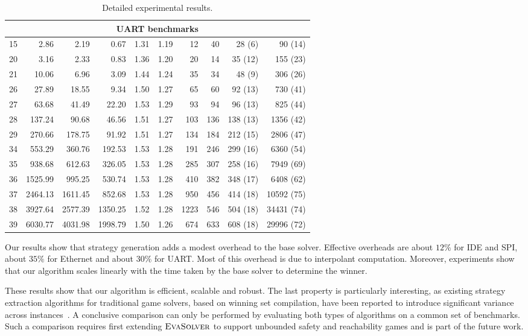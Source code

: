\begin{table}[t]
{\begin{tabular}{r r r r r r r r r r}
\hline
\multicolumn{10}{c}{UART benchmarks} \\
\hline
15 & 2.86 & 2.19 & 0.67 & 1.31 & 1.19 & 12             & 40  & 28 (6)   & 90 (14)    \\
20 & 3.16 & 2.33 & 0.83 & 1.36 & 1.20 & 20             & 14  & 35 (12)  & 155 (23)   \\
21 & 10.06 & 6.96 & 3.09 & 1.44 & 1.24 & 35            & 34  & 48 (9)   & 306 (26)   \\
26 & 27.89 & 18.55 & 9.34 & 1.50 & 1.27 & 65           & 60  & 92 (13)  & 730 (41)   \\
27 & 63.68 & 41.49 & 22.20 & 1.53 & 1.29 & 93          & 94  & 96 (13)  & 825 (44)   \\
28 & 137.24 & 90.68 & 46.56 & 1.51 & 1.27 & 103        & 136 & 138 (13) & 1356 (42)   \\
29 & 270.66 & 178.75 & 91.92 & 1.51 & 1.27 & 134       & 184 & 212 (15) & 2806 (47)   \\
34 & 553.29 & 360.76 & 192.53 & 1.53 & 1.28 & 191      & 246 & 299 (16) & 6360 (54)   \\
35 & 938.68 & 612.63 & 326.05 & 1.53 & 1.28 & 285      & 307 & 258 (16) & 7949 (69)   \\
36 & 1525.99 & 995.25 & 530.74 & 1.53 & 1.28 & 410     & 382 & 348 (17) & 6408 (62)   \\
37 & 2464.13 & 1611.45 & 852.68 & 1.53 & 1.28 & 950    & 456 & 414 (18) & 10592 (75)  \\
38 & 3927.64 & 2577.39 & 1350.25 & 1.52 & 1.28 & 1223  & 546 & 504 (18) & 34431 (74)  \\
39 & 6030.77 & 4031.98 & 1998.79 & 1.50 & 1.26 & 674   & 633 & 608 (18) & 29996 (72)  \\
\hline
\end{tabular}}
\caption{Detailed experimental results.\label{table:res}}
\end{table}

Our results show that strategy generation adds a modest overhead
to the base solver.  Effective overheads are about $12\%$ for IDE
and SPI, about $35\%$ for Ethernet and about $30\%$ for UART.
Most of this overhead is due to interpolant computation.
Moreover, experiments show that our algorithm scales linearly with
the time taken by the base solver to determine the winner.

These results show that our algorithm is efficient, 
scalable and robust.  The last property is particularly 
interesting, as existing strategy extraction algorithms for 
traditional game solvers, based on winning set compilation, have 
been reported to introduce significant variance across 
instances~\cite{Bloem_KS_14corr,Bloem_KS_13}.  A conclusive 
comparison can only be performed by evaluating both types of 
algorithms on a common set of benchmarks.  Such a comparison 
requires first extending $\textsc{EvaSolver}$ to support unbounded safety and 
reachability games and is part of the future work.


